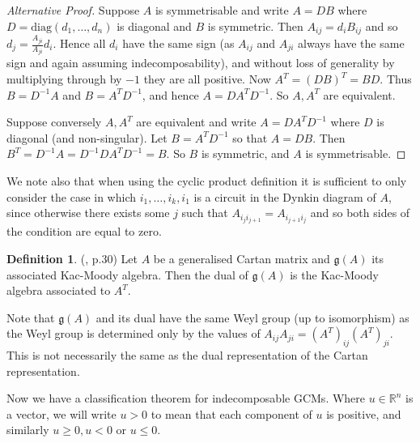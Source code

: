 \documentclass[11pt,a4paper]{report}
\theoremstyle{definition}
\newtheorem{definition}[theorem]{Definition}
\begin{document}
\begin{proof}[Alternative Proof] Suppose $A$ is symmetrisable and write $A = DB$ where $D = \text{diag}(d_1, \ldots, d_n)$ is diagonal and $B$ is symmetric. Then $A_{ij} = d_i B_{ij}$ and so $d_j = \frac{A_{ji}}{A_{ji}} d_i$. Hence all $d_i$ have the same sign (as $A_{ij}$ and $A_{ji}$ always have the same sign and again assuming indecomposability), and without loss of generality by multiplying through by $-1$ they are all positive. Now $A^T = (DB)^T = BD$. Thus $B = D^{-1} A$ and $B = A^T D^{-1}$, and hence $A = D A^T D^{-1}$. So $A, A^T$ are equivalent.

Suppose conversely $A, A^T$ are equivalent and write $A = D A^T D^{-1}$ where $D$ is diagonal (and non-singular). Let $B = A^T D^{-1}$ so that $A = DB$. Then $B^T = D^{-1} A = D^{-1} D A^T D^{-1} = B$. So $B$ is symmetric, and $A$ is symmetrisable. \end{proof}


We note also that when using the cyclic product definition it is sufficient to only consider the case in which $i_1, \ldots, i_k, i_1$ is a circuit in the Dynkin diagram of $A$, since otherwise there exists some $j$ such that $A_{i_j i_{j+1}} = A_{i_{j+1} i_j}$ and so both sides of the condition are equal to zero. 



\begin{definition} (\cite{Kac}, p.30) Let $A$ be a generalised Cartan matrix and $\mathfrak{g}(A)$ its associated Kac-Moody algebra. Then the dual of $\mathfrak{g}(A)$ is the Kac-Moody algebra associated to $A^T$.\end{definition}

Note that $\mathfrak{g}(A)$ and its dual have the same Weyl group (up to isomorphism) as the Weyl group is determined only by the values of $A_{ij} A_{ji} = (A^T)_{ij} (A^T)_{ji}$. This is not necessarily the same as the dual representation of the Cartan  representation. 

Now we have a classification theorem for indecomposable GCMs. Where $u \in \mathbb{R}^n$ is a vector, we will write $u > 0$ to mean that each component of $u$ is positive, and similarly $u \geq 0, u < 0$ or $u \leq 0$.
\end{document}
